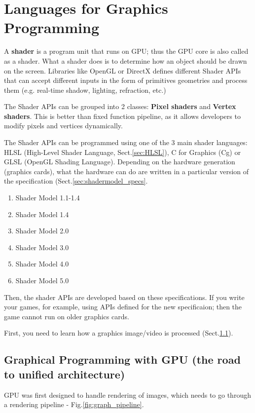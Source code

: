 \chapter{Languages for Graphics Programming}

A {\bf shader} is a program unit that runs on GPU; thus the GPU core is also
called as a shader. What a shader does is to determine how an object should
be drawn on the screen. Libraries like OpenGL or DirectX defines different
Shader APIs that can accept different inputs in the form of primitives
geometries and process them (e.g. real-time shadow, lighting, refraction, etc.)

The Shader APIs can be grouped into 2 classes: {\bf Pixel shaders} and {\bf
Vertex shaders}. This is better than fixed function pipeline, as it allows
developers to modify pixels and vertices dynamically.

The Shader APIs can be programmed using one of the 3 main shader languages: HLSL
(High-Level Shader Language, Sect.\ref{sec:HLSL}), C for Graphics (Cg) or GLSL
(OpenGL Shading Language). Depending on the hardware generation (graphics
cards), what the hardware can do are written in a particular version of the
specification (Sect.\ref{sec:shadermodel_specs}.
\begin{enumerate}
  \item Shader Model 1.1-1.4
  \item Shader Model 1.4
  \item Shader Model 2.0
  \item Shader Model 3.0
  \item Shader Model 4.0
  \item Shader Model 5.0
\end{enumerate}
Then, the shader APIs are developed based on these specifications. If you write
your games, for example, using APIs defined for the new specificaion; then the
game cannot run on older graphics cards.

First, you need to learn how a graphics image/video is processed
(Sect.\ref{sec:programming-with-gpu}).

\section{Graphical Programming with GPU (the road to unified architecture)}
\label{sec:programming-with-gpu}

GPU was first designed to handle rendering of images, which needs to go through a rendering pipeline -
Fig.\ref{fig:graph_pipeline}.

